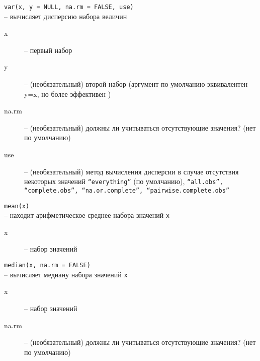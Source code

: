 \begin{enumerate}
\begin{mdframed}[style=BadassFrame]
              \texttt{var(x, y = NULL, na.rm = FALSE, use)} \\ -- вычисляет дисперсию набора величин
              \begin{description}

                \item[x] -- первый набор
                \item[y] -- (необязательный) второй набор (аргумент по умолчанию эквивалентен y=x, но более эффективен )
                \item[na.rm] -- (необязательный) должны ли учитываться отсутствующие значения? (нет по умолчанию)
                \item[use] -- (необязательный) метод вычисления дисперсии в случае отсутствия некоторых значений
                     \texttt{``everything''} (по умолчанию),  \texttt{``all.obs'', ``complete.obs'', ``na.or.complete'', ``pairwise.complete.obs''}
              \end{description}
        \end{mdframed}

		\begin{mdframed}[style=BadassFrame]

              \texttt{mean(x)} \\ 
              	-- находит арифметическое среднее набора значений \texttt{x}
              \begin{description}

                \item[x] -- набор значений
              \end{description}
        \end{mdframed}

        \begin{mdframed}[style=BadassFrame]

              \texttt{median(x, na.rm = FALSE)} \\
              	-- вычисляет медиану набора значений \texttt{x}
              \begin{description}

                \item[x] -- набор значений
                \item[na.rm] -- (необязательный) должны ли учитываться отсутствующие значения? (нет по умолчанию)
              \end{description}
        \end{mdframed}

        \begin{mdframed}[style=BadassFrame]


\end{mdframed}
\end{enumerate}
